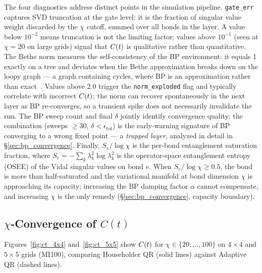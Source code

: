 The four diagnostics address distinct points in the simulation pipeline.
\texttt{gate\_err} captures SVD truncation at the gate level: it is the
fraction of singular value weight discarded by the $\chi$ cutoff, summed
over all bonds in the layer.
A value below $10^{-2}$ means truncation is not the limiting factor;
values above $10^{-1}$ (seen at $\chi=20$ on large grids) signal that
$C(t)$ is qualitative rather than quantitative.
The Bethe norm measures the self-consistency of the BP environment:
it equals 1 exactly on a tree and deviates when the Bethe approximation
breaks down on the loopy graph --- a graph containing cycles, where BP is an
approximation rather than exact~\citep{yedidia2005constructing}.
Values above 2.0 trigger the \texttt{norm\_exploded} flag and typically
correlate with incorrect $C(t)$; the norm can recover spontaneously in the
next layer as BP re-converges, so a transient spike does not necessarily
invalidate the run.
The BP sweep count and final $\delta$ jointly identify convergence quality:
the combination (sweeps $\geq 30$, $\delta < \epsilon_{\mathrm{tol}}$) is the
early-warning signature of BP converging to a wrong fixed point --- a
\emph{trapped layer}, analyzed in detail in \S\ref{sec:bp_convergence}.
Finally, $S_e / \log\chi$ is the per-bond entanglement saturation fraction,
where $S_e = -\sum_k \lambda_k^2 \log\lambda_k^2$ is the operator-space
entanglement entropy (OSEE) of the Vidal singular values on bond $e$.
When $S_e / \log\chi \geq 0.5$, the bond is more than half-saturated and
the variational manifold at bond dimension $\chi$ is approaching its capacity;
increasing the BP damping factor $\alpha$ cannot compensate, and increasing $\chi$ is the only remedy
(\S\ref{sec:bp_convergence}, capacity boundary).

\subsection{$\chi$-Convergence of $C(t)$}
\label{sec:chi_convergence}

Figures~\ref{fig:ct_4x4} and~\ref{fig:ct_5x5} show $C(t)$ for $\chi \in
\{20,\ldots,100\}$ on $4\times4$ and $5\times5$ grids (MI100), comparing
Householder QR (solid lines) against Adaptive QR (dashed lines).

